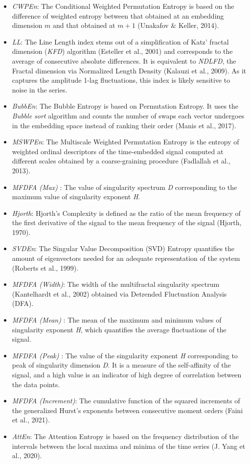 \documentclass[
  man]{apa6}
\providecommand{\tightlist}{%
  \setlength{\itemsep}{0pt}\setlength{\parskip}{0pt}}
\begin{document}
\begin{itemize}
\tightlist
\item
  \emph{CWPEn}: The Conditional Weighted Permutation Entropy is based on the difference of weighted entropy between that obtained at an embedding dimension \(m\) and that obtained at \(m+1\) (Unakafov \& Keller, 2014).
\item
  \emph{LL}: The Line Length index stems out of a simplification of Katz' fractal dimension (\emph{KFD}) algorithm (Esteller et al., 2001) and corresponds to the average of consecutive absolute differences. It is equivalent to \emph{NDLFD}, the Fractal dimension via Normalized Length Density (Kalauzi et al., 2009). As it captures the amplitude 1-lag fluctuations, this index is likely sensitive to noise in the series.
\item
  \emph{BubbEn}: The Bubble Entropy is based on Permutation Entropy. It uses the \emph{Bubble sort} algorithm and counts the number of swaps each vector undergoes in the embedding space instead of ranking their order (Manis et al., 2017).
\item
  \emph{MSWPEn}: The Multiscale Weighted Permutation Entropy is the entropy of weighted ordinal descriptors of the time-embedded signal computed at different scales obtained by a coarse-graining procedure (Fadlallah et al., 2013).
\item
  \emph{MFDFA (Max)} : The value of singularity spectrum \emph{D} corresponding to the maximum value of singularity exponent \emph{H}.
\item
  \emph{Hjorth}: Hjorth's Complexity is defined as the ratio of the mean frequency of the first derivative of the signal to the mean frequency of the signal (Hjorth, 1970).
\item
  \emph{SVDEn}: The Singular Value Decomposition (SVD) Entropy quantifies the amount of eigenvectors needed for an adequate representation of the system (Roberts et al., 1999).
\item
  \emph{MFDFA (Width)}: The width of the multifractal singularity spectrum (Kantelhardt et al., 2002) obtained via Detrended Fluctuation Analysis (DFA).
\item
  \emph{MFDFA (Mean)} : The mean of the maximum and minimum values of singularity exponent \emph{H}, which quantifies the average fluctuations of the signal.
\item
  \emph{MFDFA (Peak)} : The value of the singularity exponent \emph{H} corresponding to peak of singularity dimension \emph{D}. It is a measure of the self-affinity of the signal, and a high value is an indicator of high degree of correlation between the data points.
\item
  \emph{MFDFA (Increment)}: The cumulative function of the squared increments of the generalized Hurst's exponents between consecutive moment orders (Faini et al., 2021).
\item
  \emph{AttEn}: The Attention Entropy is based on the frequency distribution of the intervals between the local maxima and minima of the time series (J. Yang et al., 2020).
\end{itemize}
\end{document}

